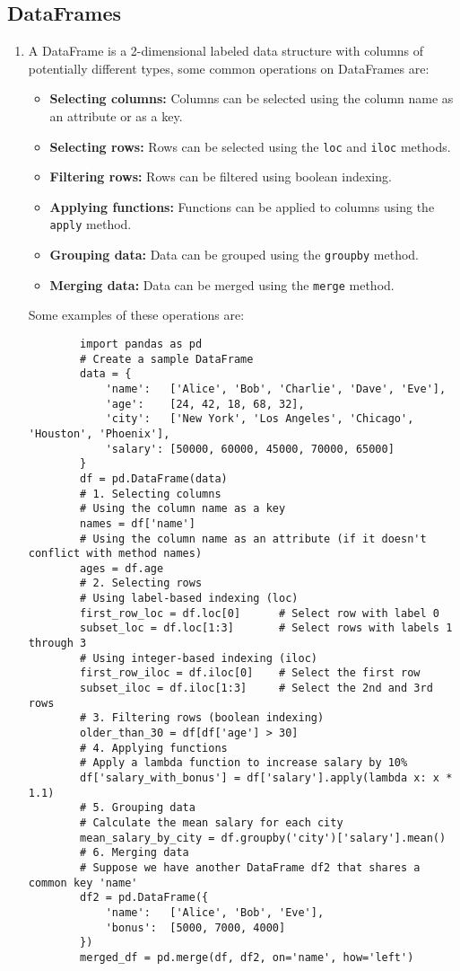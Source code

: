 \documentclass[letterpaper, 11pt]{article}
\newcommand{\1}{\mathds{1}}	%
\theoremstyle{definition}
\begin{document}
\subsection{DataFrames}
\begin{enumerate}
    \item A DataFrame is a 2-dimensional labeled data structure with columns of potentially different types, some common operations on DataFrames are:
    \begin{itemize}
        \item \textbf{Selecting columns:} Columns can be selected using the column name as an attribute or as a key.
        \item \textbf{Selecting rows:} Rows can be selected using the \texttt{loc} and \texttt{iloc} methods.
        \item \textbf{Filtering rows:} Rows can be filtered using boolean indexing.
        \item \textbf{Applying functions:} Functions can be applied to columns using the \texttt{apply} method.
        \item \textbf{Grouping data:} Data can be grouped using the \texttt{groupby} method.
        \item \textbf{Merging data:} Data can be merged using the \texttt{merge} method.
    \end{itemize}
    Some examples of these operations are:
    \begin{verbatim}
        import pandas as pd
        # Create a sample DataFrame
        data = {
            'name':   ['Alice', 'Bob', 'Charlie', 'Dave', 'Eve'],
            'age':    [24, 42, 18, 68, 32],
            'city':   ['New York', 'Los Angeles', 'Chicago', 'Houston', 'Phoenix'],
            'salary': [50000, 60000, 45000, 70000, 65000]
        }
        df = pd.DataFrame(data)
        # 1. Selecting columns
        # Using the column name as a key
        names = df['name']
        # Using the column name as an attribute (if it doesn't conflict with method names)
        ages = df.age
        # 2. Selecting rows
        # Using label-based indexing (loc)
        first_row_loc = df.loc[0]      # Select row with label 0
        subset_loc = df.loc[1:3]       # Select rows with labels 1 through 3
        # Using integer-based indexing (iloc)
        first_row_iloc = df.iloc[0]    # Select the first row
        subset_iloc = df.iloc[1:3]     # Select the 2nd and 3rd rows
        # 3. Filtering rows (boolean indexing)
        older_than_30 = df[df['age'] > 30]
        # 4. Applying functions
        # Apply a lambda function to increase salary by 10%
        df['salary_with_bonus'] = df['salary'].apply(lambda x: x * 1.1)
        # 5. Grouping data
        # Calculate the mean salary for each city
        mean_salary_by_city = df.groupby('city')['salary'].mean()
        # 6. Merging data
        # Suppose we have another DataFrame df2 that shares a common key 'name'
        df2 = pd.DataFrame({
            'name':   ['Alice', 'Bob', 'Eve'],
            'bonus':  [5000, 7000, 4000]
        })
        merged_df = pd.merge(df, df2, on='name', how='left')
    \end{verbatim}
\end{enumerate}
\end{document}
